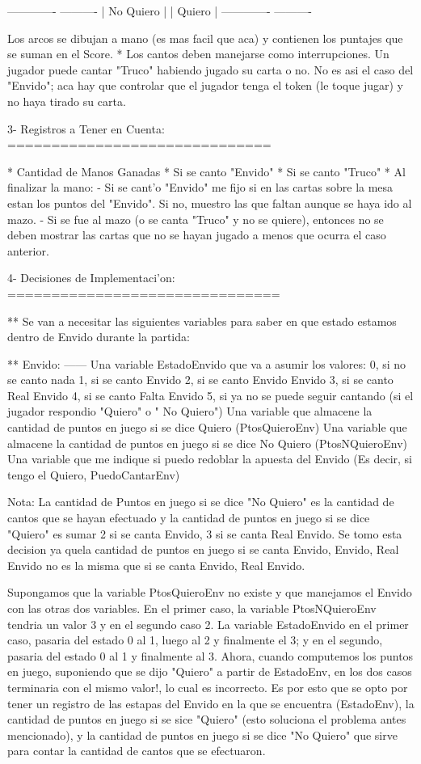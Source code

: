         -------------          ----------
        | No Quiero |          | Quiero |
        -------------          ----------

  Los arcos se dibujan a mano (es mas facil que aca) y contienen los puntajes que se suman en el Score.
* Los cantos deben manejarse como interrupciones. Un jugador puede cantar "Truco" habiendo jugado su carta o no. No es asi el caso del "Envido"; aca hay que controlar que el jugador tenga el token (le toque jugar) y no haya tirado su carta.


3- Registros a Tener en Cuenta:
==============================

  * Cantidad de Manos Ganadas
  * Si se canto "Envido"
  * Si se canto "Truco"
  * Al finalizar la mano:
    - Si se cant'o "Envido" me fijo si en las cartas sobre la mesa estan los puntos del "Envido". Si no, muestro las que faltan aunque se haya ido al mazo.
    - Si se fue al mazo (o se canta "Truco" y no se quiere), entonces no se deben mostrar las cartas que no se hayan jugado a menos que ocurra el caso anterior.


4- Decisiones de Implementaci'on:
===============================

** Se van a necesitar las siguientes variables para saber en que estado estamos dentro de Envido durante la
partida:

** Envido:
   ------
  Una variable EstadoEnvido que va a asumir los valores:
    0, si no se canto nada
    1, si se canto Envido
    2, si se canto Envido Envido
    3, si se canto Real Envido
    4, si se canto Falta Envido
    5, si ya no se puede seguir cantando (si el jugador respondio "Quiero" o " No Quiero")
  Una variable que almacene la cantidad de puntos en juego si se dice Quiero (PtosQuieroEnv)
  Una variable que almacene la cantidad de puntos en juego si se dice No Quiero (PtosNQuieroEnv)
  Una variable que me indique si puedo redoblar la apuesta del Envido (Es decir, si tengo el Quiero, PuedoCantarEnv)

Nota:
  La cantidad de Puntos en juego si se dice "No Quiero" es la cantidad de cantos que se hayan efectuado y la cantidad
de puntos en juego si se dice "Quiero" es sumar 2 si se canta Envido, 3 si se canta Real Envido. Se tomo esta decision ya quela cantidad de puntos en juego si se canta Envido, Envido, Real Envido no es la misma que si se canta Envido, Real Envido.

  Supongamos que la variable PtosQuieroEnv no existe y que manejamos el Envido con las otras dos variables. En el primer caso, la variable PtosNQuieroEnv tendria un valor 3 y en el segundo caso 2. La variable EstadoEnvido en el primer caso, pasaria del estado 0 al 1, luego al 2 y finalmente el 3; y en el segundo, pasaria del estado 0 al 1 y finalmente al 3. Ahora, cuando computemos los puntos en juego, suponiendo que se dijo "Quiero" a partir de EstadoEnv, en los dos casos terminaria con el mismo valor!, lo cual es incorrecto. Es por esto que se opto por tener un registro de las estapas del Envido en la que se encuentra (EstadoEnv), la cantidad de puntos en juego si se sice "Quiero" (esto soluciona el problema antes mencionado), y la cantidad de puntos en juego si se dice "No Quiero" que sirve para contar la cantidad de cantos que se efectuaron.

